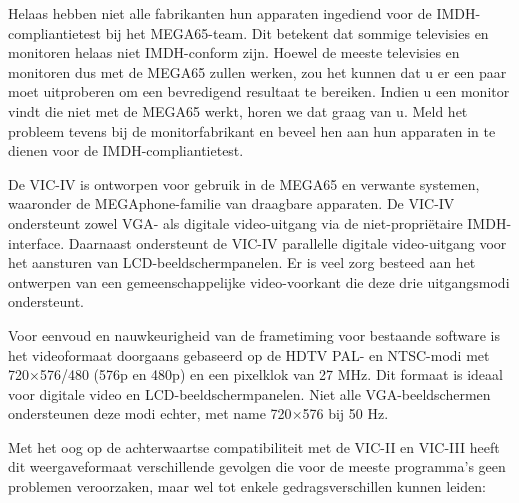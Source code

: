 Helaas hebben niet alle fabrikanten hun apparaten ingediend voor de IMDH\texttrademark{}-compliantietest bij het MEGA65-team. Dit betekent dat sommige televisies en monitoren helaas niet IMDH\texttrademark{}-conform zijn. Hoewel de meeste televisies en monitoren dus met de MEGA65 zullen werken, zou het kunnen dat u er een paar moet uitproberen om een bevredigend resultaat te bereiken. Indien u een monitor vindt die niet met de MEGA65 werkt, horen we dat graag van u. Meld het probleem tevens bij de monitorfabrikant en beveel hen aan hun apparaten in te dienen voor de IMDH\texttrademark{}-compliantietest.

De VIC-IV is ontworpen voor gebruik in de MEGA65 en verwante systemen, waaronder de MEGAphone-familie van draagbare apparaten. De VIC-IV ondersteunt zowel VGA- als digitale video-uitgang via de niet-propriëtaire IMDH\texttrademark{}-interface. Daarnaast ondersteunt de VIC-IV parallelle digitale video-uitgang voor het aansturen van LCD-beeldschermpanelen. Er is veel zorg besteed aan het ontwerpen van een gemeenschappelijke video-voorkant die deze drie uitgangsmodi ondersteunt.

Voor eenvoud en nauwkeurigheid van de frametiming voor bestaande software is het videoformaat doorgaans gebaseerd op de HDTV PAL- en NTSC-modi met 720$\times$576/480 (576p en 480p) en een pixelklok van 27 MHz. Dit formaat is ideaal voor digitale video en LCD-beeldschermpanelen. Niet alle VGA-beeldschermen ondersteunen deze modi echter, met name 720$\times$576 bij 50 Hz.

Met het oog op de achterwaartse compatibiliteit met de VIC-II en VIC-III heeft dit weergaveformaat verschillende gevolgen die voor de meeste programma's geen problemen veroorzaken, maar wel tot enkele gedragsverschillen kunnen leiden:

